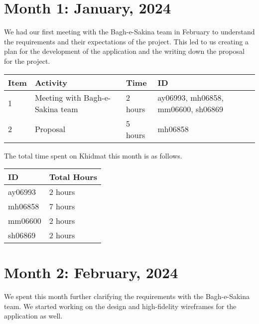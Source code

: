 \documentclass{article}
\begin{document}

\newpage %
\section*{Month 1: January, 2024}

We had our first meeting with the Bagh-e-Sakina team in February to understand the requirements and their expectations of the project. This led to us creating a plan for the development of the application and the writing down the proposal for the project.

\vspace{1em}

\noindent \begin{tabular}{|l|l|l|l|}
  \hline
  Item & Activity     & Time  & ID \\ \hline
  1    & Meeting with Bagh-e-Sakina team & 2 hours  & ay06993, mh06858, mm06600, sh06869 \\ \hline
  2    & Proposal     & 5 hours & mh06858 \\ \hline
\end{tabular}

\vspace{1em}

\noindent The total time spent on Khidmat this month is as follows.

\vspace{1em}

\noindent \begin{tabular}{|l|l|}
  \hline
  ID      & Total Hours \\ \hline
  ay06993 & 2 hours     \\ \hline
  mh06858 & 7 hours     \\ \hline
  mm06600 & 2 hours     \\ \hline
  sh06869 & 2 hours     \\ \hline
\end{tabular}

\newpage %
\section*{Month 2: February, 2024}

We spent this month further clarifying the requirements with the Bagh-e-Sakina team. We started working on the design and high-fidelity wireframes for the application as well. 
\end{document}
